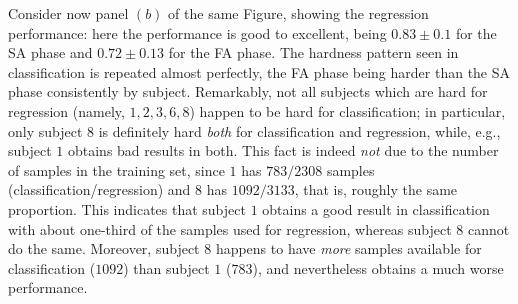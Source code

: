 Consider now panel $(b)$ of the same Figure, showing the regression
performance: here the performance is good to excellent, being $0.83
\pm 0.1$ for the SA phase and $0.72 \pm 0.13$ for the FA phase. The
hardness pattern seen in classification is repeated almost perfectly,
the FA phase being harder than the SA phase consistently by
subject. Remarkably, not all subjects which are hard for regression
(namely, $1,2,3,6,8$) happen to be hard for classification; in
particular, only subject $8$ is definitely hard \emph{both} for
classification and regression, while, e.g., subject $1$ obtains bad
results in both. This fact is indeed \emph{not} due to the number of
samples in the training set, since $1$ has $783/2308$ samples
(classification/regression) and $8$ has $1092/3133$, that is, roughly
the same proportion. This indicates that subject $1$ obtains a good
result in classification with about one-third of the samples used for
regression, whereas subject $8$ cannot do the same. Moreover, subject
$8$ happens to have \emph{more} samples available for classification
($1092$) than subject $1$ ($783$), and nevertheless obtains a much
worse performance.



